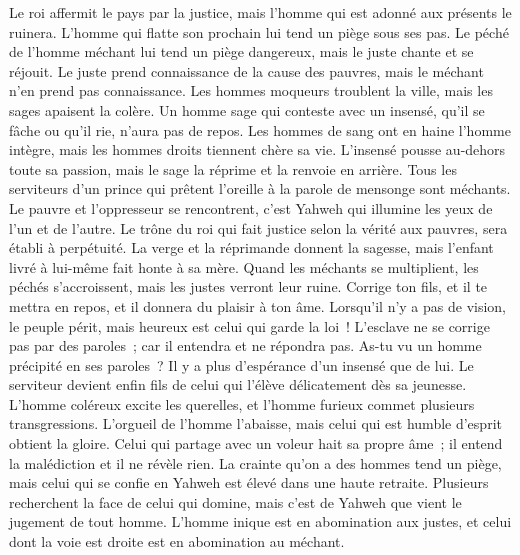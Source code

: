 \begin{multicols}{2}
Le roi affermit le pays par la justice, mais l'homme qui est adonné aux présents le ruinera.
L'homme qui flatte son prochain lui tend un piège sous ses pas.
Le péché de l'homme méchant lui tend un piège dangereux, mais le juste chante et se réjouit.
Le juste prend connaissance de la cause des pauvres, mais le méchant n'en prend pas connaissance.
Les hommes moqueurs troublent la ville, mais les sages apaisent la colère.
Un homme sage qui conteste avec un insensé, qu'il se fâche ou qu'il rie, n'aura pas de repos.
Les hommes de sang ont en haine l'homme intègre, mais les hommes droits tiennent chère sa vie.
L'insensé pousse au-dehors toute sa passion, mais le sage la réprime et la renvoie en arrière.
Tous les serviteurs d'un prince qui prêtent l'oreille à la parole de mensonge sont méchants.
Le pauvre et l'oppresseur se rencontrent, c'est Yahweh qui illumine les yeux de l'un et de l'autre.
Le trône du roi qui fait justice selon la vérité aux pauvres, sera établi à perpétuité.
La verge et la réprimande donnent la sagesse, mais l'enfant livré à lui-même fait honte à sa mère.
Quand les méchants se multiplient, les péchés s'accroissent, mais les justes verront leur ruine.
Corrige ton fils, et il te mettra en repos, et il donnera du plaisir à ton âme.
Lorsqu'il n'y a pas de vision, le peuple périt, mais heureux est celui qui garde la loi~!
L'esclave ne se corrige pas par des paroles~; car il entendra et ne répondra pas.
As-tu vu un homme précipité en ses paroles~? Il y a plus d'espérance d'un insensé que de lui.
Le serviteur devient enfin fils de celui qui l'élève délicatement dès sa jeunesse. 
L'homme coléreux excite les querelles, et l'homme furieux commet plusieurs transgressions.
L'orgueil de l'homme l'abaisse, mais celui qui est humble d'esprit obtient la gloire.
Celui qui partage avec un voleur hait sa propre âme~; il entend la malédiction et il ne révèle rien.
La crainte qu'on a des hommes tend un piège, mais celui qui se confie en Yahweh est élevé dans une haute retraite.
Plusieurs recherchent la face de celui qui domine, mais c'est de Yahweh que vient le jugement de tout homme.
L'homme inique est en abomination aux justes, et celui dont la voie est droite est en abomination au méchant.

\end{multicols}
